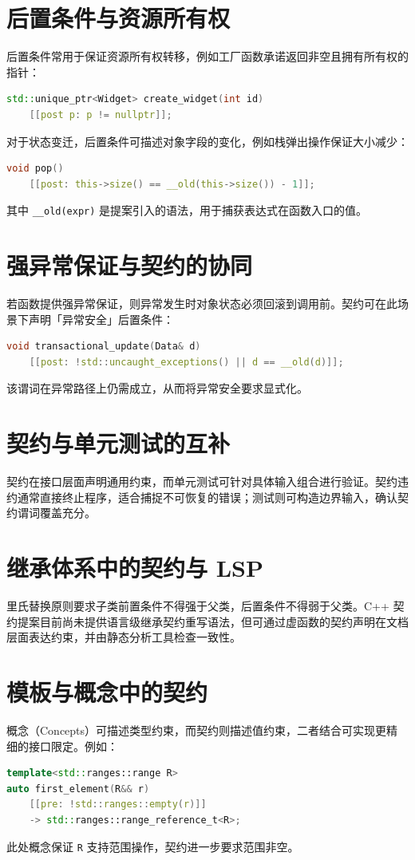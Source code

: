 \chapter{后置条件与资源所有权}
后置条件常用于保证资源所有权转移，例如工厂函数承诺返回非空且拥有所有权的指针：\par
\begin{lstlisting}[language=cpp]
std::unique_ptr<Widget> create_widget(int id)
    [[post p: p != nullptr]];
\end{lstlisting}
对于状态变迁，后置条件可描述对象字段的变化，例如栈弹出操作保证大小减少：\par
\begin{lstlisting}[language=cpp]
void pop()
    [[post: this->size() == __old(this->size()) - 1]];
\end{lstlisting}
其中 \texttt{\_{}\_{}old(expr)} 是提案引入的语法，用于捕获表达式在函数入口的值。\par
\chapter{强异常保证与契约的协同}
若函数提供强异常保证，则异常发生时对象状态必须回滚到调用前。契约可在此场景下声明「异常安全」后置条件：\par
\begin{lstlisting}[language=cpp]
void transactional_update(Data& d)
    [[post: !std::uncaught_exceptions() || d == __old(d)]];
\end{lstlisting}
该谓词在异常路径上仍需成立，从而将异常安全要求显式化。\par
\chapter{契约与单元测试的互补}
契约在接口层面声明通用约束，而单元测试可针对具体输入组合进行验证。契约违约通常直接终止程序，适合捕捉不可恢复的错误；测试则可构造边界输入，确认契约谓词覆盖充分。\par
\chapter{继承体系中的契约与 LSP}
里氏替换原则要求子类前置条件不得强于父类，后置条件不得弱于父类。C++ 契约提案目前尚未提供语言级继承契约重写语法，但可通过虚函数的契约声明在文档层面表达约束，并由静态分析工具检查一致性。\par
\chapter{模板与概念中的契约}
概念（Concepts）可描述类型约束，而契约则描述值约束，二者结合可实现更精细的接口限定。例如：\par
\begin{lstlisting}[language=cpp]
template<std::ranges::range R>
auto first_element(R&& r)
    [[pre: !std::ranges::empty(r)]]
    -> std::ranges::range_reference_t<R>;
\end{lstlisting}
此处概念保证 \texttt{R} 支持范围操作，契约进一步要求范围非空。\par
